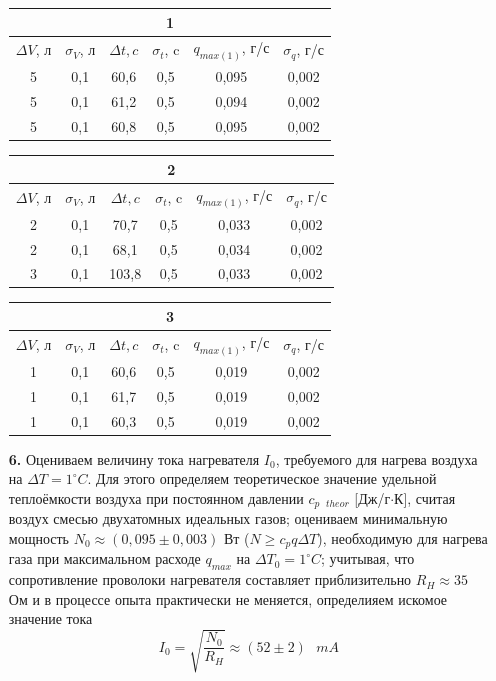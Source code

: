 \documentclass[a4paper, 12pt]{article}%
\begin{document}
\begin{enumerate}
\begin{center}
\begin{tabular}{|c|c|c|c|c|c|}
\hline
\multicolumn{6}{|c|}{1} \\
\hline
$\Delta V$, л & $\sigma_V$, л & $\Delta t, c$ & $\sigma_t$, c & $q_{max(1)}$, г/с & $\sigma_q$, г/с \\ \hline
5             & 0,1           & 60,6          & 0,5           & 0,095    & 0,002           \\ \hline
5             & 0,1           & 61,2          & 0,5           & 0,094    & 0,002           \\ \hline
5             & 0,1           & 60,8          & 0,5           & 0,095    & 0,002           \\ \hline
\end{tabular}

\begin{tabular}{|c|c|c|c|c|c|}
\hline
\multicolumn{6}{|c|}{2} \\ \hline
$\Delta V$, л & $\sigma_V$, л & $\Delta t, c$ & $\sigma_t$, c & $q_{max(1)}$, г/с & $\sigma_q$, г/с \\ \hline
2 & 0,1 & 70,7 & 0,5 & 0,033 & 0,002 \\ \hline
2 & 0,1 & 68,1 & 0,5 & 0,034 & 0,002 \\ \hline
3 & 0,1 & 103,8 & 0,5 & 0,033 & 0,002 \\ \hline
\end{tabular}

\begin{tabular}{|c|c|c|c|c|c|}
\hline
\multicolumn{6}{|c|}{3} \\ \hline
$\Delta V$, л & $\sigma_V$, л & $\Delta t, c$ & $\sigma_t$, c & $q_{max(1)}$, г/с & $\sigma_q$, г/с \\ \hline
1 & 0,1 & 60,6 & 0,5 & 0,019 & 0,002 \\ \hline
1 & 0,1 & 61,7 & 0,5 & 0,019 & 0,002 \\ \hline
1 & 0,1 & 60,3 & 0,5 & 0,019 & 0,002 \\ \hline
\end{tabular}
\end{center}
\item [\textbf{6.}] Оцениваем величину тока нагревателя $I_0$, требуемого для нагрева воздуха на $\Delta T = 1 ^{\circ}C$. Для этого определяем теоретическое значение удельной теплоёмкости воздуха при постоянном давлении $c_{p \text{ } theor}$ [Дж/г$\cdot$К], считая воздух смесью двухатомных идеальных газов; оцениваем минимальную мощность $N_0 \approx (0,095 \pm 0,003)$ Вт ($N \geq c_p q \Delta T$), необходимую для нагрева газа при максимальном расходе $q_{max}$ на $\Delta T_0 = 1^{\circ}C$; учитывая, что сопротивление проволоки нагревателя составляет приблизительно $R_H \approx 35$ Ом и в процессе опыта практически не меняется, определияем искомое значение тока $$I_0 = \sqrt{\dfrac{N_0}{R_H}} \approx (52 \pm 2) \text{ } mA$$  
\end{enumerate}
\end{document}
